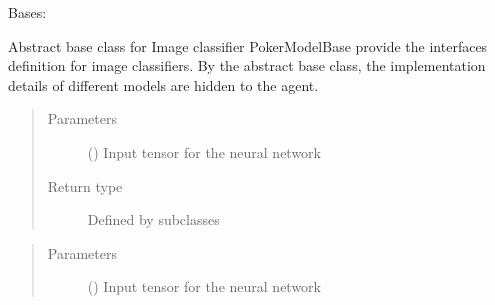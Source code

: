 \documentclass[letterpaper,10pt,english]{sphinxmanual}
\begin{document}
\begin{fulllineitems}
\label{\detokenize{models:models.base_model.PokerModelBase}}
\pysigstartsignatures
{}
\pysigstopsignatures
\sphinxAtStartPar
Bases: 

\sphinxAtStartPar
Abstract base class for Image classifier
PokerModelBase provide the interfaces definition for image classifiers.
By the abstract base class, the implementation details of different models
are hidden to the agent.

\begin{fulllineitems}
\label{\detokenize{models:models.base_model.PokerModelBase.forward}}
\pysigstartsignatures
{}
\pysigstopsignatures\begin{quote}\begin{description}
\item[{Parameters}] \leavevmode
\sphinxAtStartPar
{} () \textendash{} Input tensor for the neural network

\item[{Return type}] \leavevmode
\sphinxAtStartPar
Defined by subclasses

\end{description}\end{quote}

\end{fulllineitems}


\begin{fulllineitems}
\label{\detokenize{models:models.base_model.PokerModelBase.predict}}
\pysigstartsignatures
{}
\pysigstopsignatures\begin{quote}\begin{description}
\item[{Parameters}] \leavevmode
\sphinxAtStartPar
{} () \textendash{} Input tensor for the neural network


\end{description}
\end{quote}
\end{fulllineitems}
\end{fulllineitems}
\end{document}
